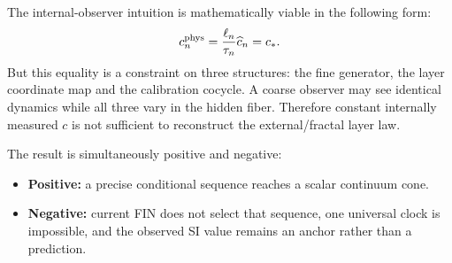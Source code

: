 \documentclass[11pt,a4paper]{article}
\theoremstyle{remark}\newtheorem{remark}[theorem]{Remark}
\begin{document}
The internal-observer intuition is mathematically viable in the following form:
\[
c_n^{\rm phys}=\frac{\ell_n}{\tau_n}\widehat c_n
=c_*.
\]
But this equality is a constraint on three structures: the fine generator, the layer coordinate map and the calibration cocycle. A coarse observer may see identical dynamics while all three vary in the hidden fiber. Therefore constant internally measured $c$ is not sufficient to reconstruct the external/fractal layer law.

The result is simultaneously positive and negative:
\begin{itemize}
\item \textbf{Positive:} a precise conditional sequence reaches a scalar continuum cone.
\item \textbf{Negative:} current FIN does not select that sequence, one universal clock is impossible, and the observed SI value remains an anchor rather than a prediction.
\end{itemize}
\end{document}
